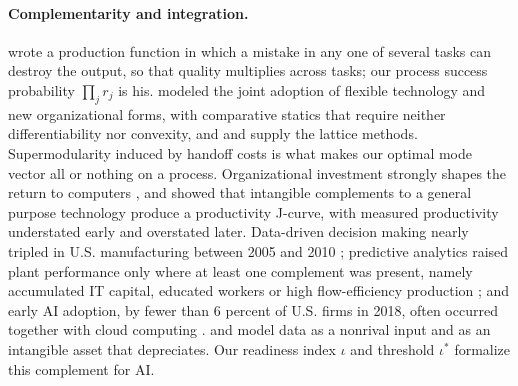 \paragraph{Complementarity and integration.} \citet{kremer1993oring} wrote a production function in which a mistake in any one of several tasks can destroy the output, so that quality multiplies across tasks; our process success probability $\prod_j r_j$ is his. \citet{milgrom1990economics} modeled the joint adoption of flexible technology and new organizational forms, with comparative statics that require neither differentiability nor convexity, and \citet{topkis1998supermodularity} and \citet{milgrom1994monotone} supply the lattice methods. Supermodularity induced by handoff costs is what makes our optimal mode vector all or nothing on a process. Organizational investment strongly shapes the return to computers \citep{brynjolfsson2000beyond}, and \citet{brynjolfsson2021productivity} showed that intangible complements to a general purpose technology produce a productivity J-curve, with measured productivity understated early and overstated later. Data-driven decision making nearly tripled in U.S. manufacturing between 2005 and 2010 \citep{brynjolfsson2016rapid}; predictive analytics raised plant performance only where at least one complement was present, namely accumulated IT capital, educated workers or high flow-efficiency production \citep{brynjolfsson2021power}; and early AI adoption, by fewer than 6 percent of U.S. firms in 2018, often occurred together with cloud computing \citep{mcelheran2024ai}. \citet{jones2020nonrivalry} and \citet{farboodi2021model} model data as a nonrival input and as an intangible asset that depreciates. Our readiness index $\iota$ and threshold $\iota^*$ formalize this complement for AI.

